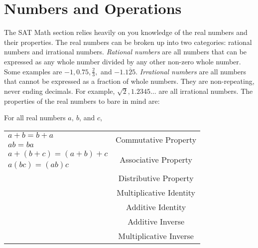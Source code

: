 \chapter{Numbers and Operations}

The SAT Math section relies heavily on you knowledge of the real numbers and their properties. The real numbers can be broken up into two categories: rational numbers and irrational numbers. \textit{Rational numbers} are all numbers that can be expressed as any whole number divided by any other non-zero whole number. Some examples are $-1, 0.75, \frac{2}{3},$ and $-1.\overline{125}$. \textit{Irrational numbers} are all numbers that cannot be expressed as a fraction of whole numbers. They are non-repeating, never ending decimals. For example, $\sqrt{2}, 1.2345\ldots$ are all irrational numbers. The properties of the real numbers to bare in mind are:

\vspace{2em}

\bigskip
For all real numbers $a,\ b$, and $c$,

\begin{center}
\renewcommand{\arraystretch}{1.25}
\begin{tabular}{|>{\centering}p{2in}|c|}\hline
$a+b=b+a$ & \multirow{2}{*}{Commutative Property}\\
$ab=ba$ & \\\hline
$a+(b+c)=(a+b)+c$ & \multirow{2}{*}{Associative Property}\\
$a(bc)=(ab)c$&\\\hline
\multirow{2}{*}{$a(b+c)=ab+ac$} & \multirow{2}{*}{Distributive Property}\\
&\\\hline
\multirow{2}{*}{$a\cdot1=a$} & \multirow{2}{*}{Multiplicative Identity}\\
&\\\hline
\multirow{2}{*}{$a+0=a$} & \multirow{2}{*}{Additive Identity}\\
&\\\hline
\multirow{2}{*}{$a+(-a)=0$} & \multirow{2}{*}{Additive Inverse}\\
&\\\hline
\multirow{2}{*}{$a\cdot\frac{1}{a}=1$} & \multirow{2}{*}{Multiplicative Inverse}\\
&\\\hline
\end{tabular}
\end{center}